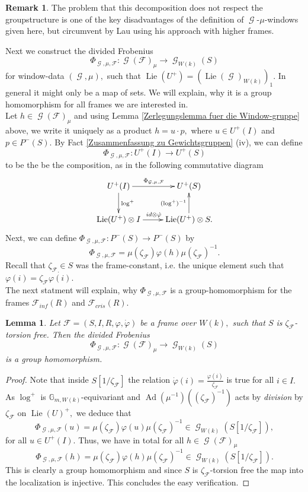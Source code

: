 \documentclass[a4paper,10,5 pt]{amsart}
\newtheorem{Lemma}[Satz]{Lemma}
\theoremstyle{definition}
\newtheorem{Remark}{Remark}
\DeclareMathOperator{\Lie}{Lie}
\DeclareMathOperator{\Ad}{Ad}
\DeclareMathOperator{\G}{\mathcal{G}}
\begin{document}
\begin{Remark}
The problem that this decomposition does not respect the groupstructure is one of the key disadvantages of the definition of $\G$-$\mu$-windows given here, but circumvent by Lau using his approach with higher frames.
\end{Remark}
Next we construct the divided Frobenius
$$\Phi_{\G,\mu,\mathcal{F}}\colon \G(\mathcal{F})_{\mu}\rightarrow \G_{W(k)}(S)$$
for window-data $(\G,\mu),$ such that $\Lie(U^{+})=(\Lie(\G)_{W(k)})_{1}.$
In general it might only be a map of sets. We will explain, why it is a group homomorphism for all frames we are interested in.
\\
Let $h\in \G(\mathcal{F})_{\mu}$ and using Lemma \ref{Zerlegungslemma fuer die Window-gruppe} above, we write it uniquely as a product $h=u\cdot p,$ where $u\in U^{+}(I)$ and $p\in P^{-}(S).$ By Fact \ref{Zusammenfassung zu Gewichtsgruppen} (iv), we can define
$$ \Phi_{\G,\mu,\mathcal{F}}\colon U^{+}(I) \rightarrow U^{+}(S)$$ to be the be the composition, as in the following commutative diagram
$$
\xymatrix{
U^{+}(I) \ar[d]^{\log^{+}} \ar[r]^{\Phi_{\G,\mu,\mathcal{F}}} & U^{+}(S) \\
\Lie(U^{+}) \otimes I \ar[r]^{id\otimes \dot{\varphi}} & \Lie(U^{+}) \otimes S \ar[u]^{(\text{log}^{+})^{-1}}.
}
$$
Next, we can define $\Phi_{\G,\mu,\mathcal{F}}\colon P^{-}(S) \rightarrow P^{-}(S)$ by $$\Phi_{\G,\mu,\mathcal{F}}=\mu(\zeta_{\mathcal{F}})\varphi(h)\mu(\zeta_{\mathcal{F}})^{-1}.$$ Recall that $\zeta_{\mathcal{F}}\in S$ was the frame-constant, i.e. the unique element such that $\varphi(i)=\zeta_{\mathcal{F}}\dot{\varphi(i)}.$
\\
The next statment will explain, why $\Phi_{\G,\mu,\mathcal{F}}$ is a group-homomorphism for the frames $\mathcal{F}_{inf}(R)$ and $\mathcal{F}_{cris}(R).$
\begin{Lemma}
Let $\mathcal{F}=(S,I,R,\varphi,\dot{\varphi})$ be a frame over $W(k),$ such that $S$ is $\zeta_{\mathcal{F}}$-torsion free. Then the divided Frobenius
$$\Phi_{\G,\mu,\mathcal{F}}\colon \G(\mathcal{F})_{\mu}\rightarrow \G_{W(k)}(S)
$$
is a group homomorphism.
\end{Lemma}
\begin{proof}
Note that inside $S[1/\zeta_{\mathcal{F}}]$ the relation $\dot{\varphi}(i)=\frac{\varphi(i)}{\zeta_{\mathcal{
F}}}$ is true for all $i\in I.$ As $\log^{+}$ is $\mathbb{G}_{m,W(k)}$-equivariant and $\Ad(\mu^{-1})((\zeta_{\mathcal{F}})^{-1})$ acts by \textit{division} by $\zeta_{\mathcal{F}}$ on $\Lie(U)^{+},$ we deduce that
$$\Phi_{\G,\mu,\mathcal{F}}(u)=\mu(\zeta_{\mathcal{F}})\varphi(u)\mu(\zeta_{\mathcal{F}})^{-1}\in \G_{W(k)}(S[1/\zeta_{\mathcal{F}}])
,$$ for all $u\in U^{+}(I).$
Thus, we have in total for all $h\in \G(\mathcal{F})_{\mu}$
\begin{equation}\label{Beschreibung geteilter Frobenius nach invertieren}
\Phi_{\G,\mu,\mathcal{F}}(h)=\mu(\zeta_{\mathcal{F}})\varphi(h)\mu(\zeta_{\mathcal{F}})^{-1}\in \G_{W(k)}(S[1/\zeta_{\mathcal{F}}]).
\end{equation}
This is clearly a group homomorphism and since $S$ is $\zeta_{\mathcal{F}}$-torsion free the map into the localization is injective. This concludes the easy verification.
\end{proof}
\end{document}
